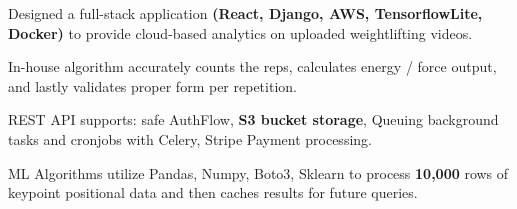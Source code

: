 

\begin{cventries}


  \cventry
    {
    } %
    {} %
    {} %
    {} %
    {
      \begin{cvitems} %
        \item {Designed a full-stack application \textbf{(React, Django, AWS, TensorflowLite, Docker)} to provide cloud-based analytics on uploaded weightlifting videos.}
        \item{In-house algorithm accurately counts the reps, calculates energy / force output, and lastly validates proper form per repetition.}
        \item{REST API supports: safe AuthFlow, \textbf{S3 bucket storage}, Queuing background tasks and cronjobs with Celery, Stripe Payment processing.}
        \item{ML Algorithms utilize Pandas, Numpy, Boto3, Sklearn to process \textbf{10,000} rows of keypoint positional data and then caches results for future queries.}
      \end{cvitems}
    }



\end{cventries}

